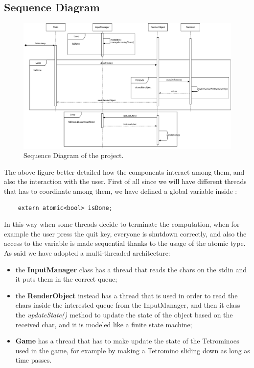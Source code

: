 \documentclass{article}
\begin{document}
\subsection{Sequence Diagram}
\begin{figure}[H]
    \centering
    \includegraphics[width=\linewidth]{img/SequenceDiagram.pdf}
    \caption{Sequence Diagram of the project.}
    \label{fig:sequence}
\end{figure}
The above figure better detailed how the components interact among them, and also the interaction with the user.
First of all since we will have different threads that has to coordinate among them, we have defined a global variable inside :
\begin{verbatim}
    extern atomic<bool> isDone;
\end{verbatim}
In this way when some threads decide to terminate the computation, when for example the user press the quit key, everyone is shutdown correctly, and also the access to the variable is made sequential thanks to the usage of the atomic type.
As said we have adopted a multi-threaded architecture:
\begin{itemize}
    \item the \textbf{InputManager} class has a thread that reads the chars on the stdin and it puts them in the correct queue;
    \item the \textbf{RenderObject} instead has a thread that is used in order to read the chars inside the interested queue from the InputManager, and then it class the \textit{updateState()} method to update the state of the object based on the received char, and it is modeled like a finite state machine;
    \item \textbf{Game} has a thread that has to make update the state of the Tetrominoes used in the game, for example by making a Tetromino sliding down as long as time passes.
\end{itemize}
\end{document}
